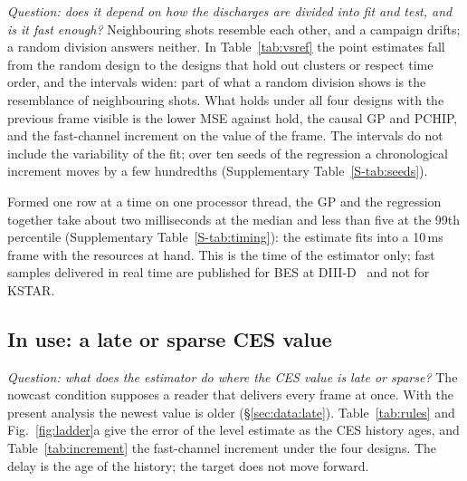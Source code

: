 \documentclass[11pt,a4paper]{article}
\newcommand{\SuppTab}[1]{Supplementary Table~\ref{S-#1}}
\begin{document}
\emph{Question: does it depend on how the discharges are divided into fit and test, and is it fast enough?} Neighbouring shots resemble each other, and a campaign drifts; a random division answers neither. In Table~\ref{tab:vsref} the point estimates fall from the random design to the designs that hold out clusters or respect time order, and the intervals widen: part of what a random division shows is the resemblance of neighbouring shots. What holds under all four designs with the previous frame visible is the lower MSE against hold, the causal GP and PCHIP, and the fast-channel increment on the value of the frame. The intervals do not include the variability of the fit; over ten seeds of the regression a chronological increment moves by a few hundredths (\SuppTab{tab:seeds}).

Formed one row at a time on one processor thread, the GP and the regression together take about two milliseconds at the median and less than five at the 99th percentile (\SuppTab{tab:timing}): the estimate fits into a 10\,ms frame with the resources at hand. This is the time of the estimator only; fast samples delivered in real time are published for BES at DIII-D~\citep{Kim2026RealTimePlasma} and not for KSTAR.

\subsection{In use: a late or sparse CES value}
\label{sec:res:use}

\emph{Question: what does the estimator do where the CES value is late or sparse?} The nowcast condition supposes a reader that delivers every frame at once. With the present analysis the newest value is older (\S\ref{sec:data:late}). Table~\ref{tab:rules} and Fig.~\ref{fig:ladder}a give the error of the level estimate as the CES history ages, and Table~\ref{tab:increment} the fast-channel increment under the four designs. The delay is the age of the history; the target does not move forward.

\begin{table}[tbp]
  \centering
  \caption{The estimator in use: error of the level estimate by availability rule, KSTAR, random design V1, target L5. Upper block: fixed delays on the rows complete under all of them (\NCommonRows{} rows, \NCommonDischarges{} discharges, \NCommonClusters{} clusters). Lower block: the beam-modulation schedule S, with an analysis time of zero, and the previous frame on the same rows (\NSRows{} rows, \NSDischarges{} discharges, \NSClusters{} clusters). O is the reading of the frame itself, which does not exist before the frame has been analysed. One estimator is fitted per rule. Intervals: 95\,\%, shot clusters resampled; bold: the interval excludes zero.}
  \label{tab:rules}
  \TabRulesVone
\end{table}
\end{document}
